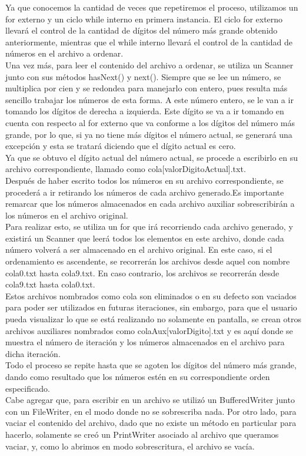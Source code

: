 \documentclass[12pt,letterpaper]{article}
\begin{document}
\begin{large}
Ya que conocemos la cantidad de veces que repetiremos el proceso, utilizamos un for externo y un ciclo while interno en primera instancia. El ciclo for externo llevará el control de la cantidad de dígitos del número más grande obtenido anteriormente, mientras que el while interno llevará el control de la cantidad de números en el archivo a ordenar.\\
Una vez más, para leer el contenido del archivo a ordenar, se utiliza un Scanner junto con sus métodos hasNext() y next(). Siempre que se lee un número, se multiplica por cien y se redondea para manejarlo con entero, pues resulta más sencillo trabajar los números de esta forma. A este número entero, se le van a ir tomando los dígitos de derecha a izquierda. Este dígito se va a ir tomando en cuenta con respecto al for externo que va conforme a los dígitos del número más grande, por lo que, si ya no tiene más dígitos el número actual, se generará una excepción y esta se tratará diciendo que el dígito actual es cero.\\
Ya que se obtuvo el dígito actual del número actual, se procede a escribirlo en su archivo correspondiente, llamado como cola[valorDigitoActual].txt.\\
Después de haber escrito todos los números en su archivo correspondiente, se procederá a ir retirando los números de cada archivo generado.Es importante remarcar que los números almacenados en cada archivo auxiliar sobrescribirán a los números en el archivo original. \\
Para realizar esto, se utiliza un for que irá recorriendo cada archivo generado, y existirá un Scanner que leerá todos los elementos en este archivo, donde cada número volverá a ser almacenado en el archivo original. En este caso, si el ordenamiento es ascendente, se recorrerán los archivos desde aquel con nombre cola0.txt hasta cola9.txt. En caso contrario, los archivos se recorrerán desde cola9.txt hasta cola0.txt. \\
Estos archivos nombrados como cola son eliminados o en su defecto son vaciados para poder ser utilizados en futuras iteraciones, sin embargo, para que el usuario pueda visualizar lo que se está realizando no solamente en pantalla, se crean otros archivos auxiliares nombrados como colaAux[valorDigito].txt y es aquí donde se muestra el número de iteración y los números almacenados en el archivo para dicha iteración.\\
Todo el proceso se repite hasta que se agoten los dígitos del número más grande, dando como resultado que los números estén en su correspondiente orden especificado. \\
Cabe agregar que, para escribir en un archivo se utilizó un BufferedWriter junto con un FileWriter, en el modo donde no se sobrescriba nada. Por otro lado, para vaciar el contenido del archivo, dado que no existe un método en particular para hacerlo, solamente se creó un PrintWriter asociado al archivo que queramos vaciar, y, como lo abrimos en modo sobrescritura, el archivo se vacía.\par 
\vspace{0.5cm}
\end{large}
\end{document}
